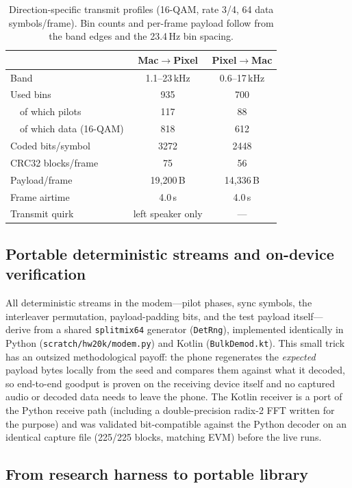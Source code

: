 \documentclass[11pt]{article}
\begin{document}
\begin{table}[t]
\centering
\caption{Direction-specific transmit profiles (16-QAM, rate 3/4, 64 data
symbols/frame). Bin counts and per-frame payload follow from the band edges
and the 23.4\,Hz bin spacing.}
\label{tab:profiles}
\begin{tabular}{lcc}
\toprule
 & Mac$\rightarrow$Pixel & Pixel$\rightarrow$Mac \\
\midrule
Band & 1.1--23\,kHz & 0.6--17\,kHz \\
Used bins & 935 & 700 \\
~~of which pilots & 117 & 88 \\
~~of which data (16-QAM) & 818 & 612 \\
Coded bits/symbol & 3272 & 2448 \\
CRC32 blocks/frame & 75 & 56 \\
Payload/frame & 19{,}200\,B & 14{,}336\,B \\
Frame airtime & 4.0\,s & 4.0\,s \\
Transmit quirk & left speaker only & --- \\
\bottomrule
\end{tabular}
\end{table}

\subsection{Portable deterministic streams and on-device verification}
\label{sec:detrng}

All deterministic streams in the modem---pilot phases, sync symbols, the
interleaver permutation, payload-padding bits, and the test payload itself---
derive from a shared \texttt{splitmix64} generator (\texttt{DetRng}),
implemented identically in Python (\texttt{scratch/hw20k/modem.py}) and Kotlin
(\texttt{BulkDemod.kt}). This small trick has an outsized methodological
payoff: the phone regenerates the \emph{expected} payload bytes locally from
the seed and compares them against what it decoded, so end-to-end goodput is
proven on the receiving device itself and no captured audio or decoded data
needs to leave the phone. The Kotlin receiver is a port of the Python receive
path (including a double-precision radix-2 FFT written for the purpose) and
was validated bit-compatible against the Python decoder on an identical
capture file (225/225 blocks, matching EVM) before the live runs.

\subsection{From research harness to portable library}
\label{sec:library}
\end{document}
